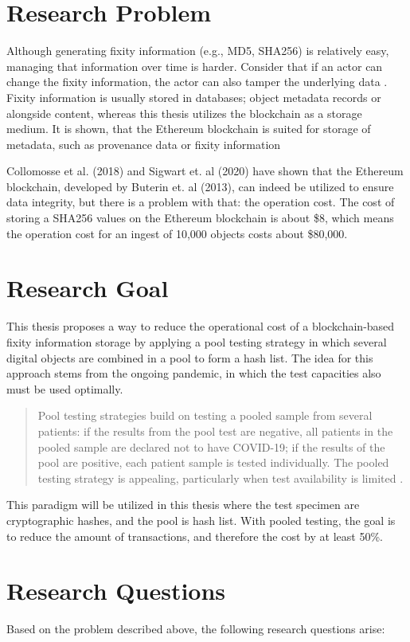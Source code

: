 \section{Research Problem}
Although generating fixity information (e.g., MD5, SHA256) is relatively easy, managing that information over time is harder. Consider that if an actor can change the fixity information, the actor can also tamper the underlying data \cite[35]{kirschenbaum2010digital}. Fixity information is usually stored in databases; object metadata records or alongside content, whereas this thesis utilizes the blockchain as a storage medium.
It is shown, that the Ethereum blockchain is suited for storage of metadata, such as provenance data or fixity information

Collomosse et al. (2018) and Sigwart et. al (2020) have shown that the Ethereum blockchain, developed by Buterin et. al (2013), can indeed be utilized to ensure data integrity, but there is a problem with that: the operation cost. The cost of storing a SHA256 values on the Ethereum blockchain is about \$8, which means the operation cost for an ingest of 10,000 objects costs about \$80,000.

\section{Research Goal}
This thesis proposes a way to reduce the operational cost of a blockchain-based fixity information storage by applying a pool testing strategy in which several digital objects are combined in a pool to form a hash list. The idea for this approach stems from the ongoing pandemic, in which the test capacities also must be used optimally.
\begin{quote}
Pool testing strategies build on testing a pooled sample from several patients: if the results from the pool test are negative, all patients in the pooled sample are declared not to have COVID-19; if the results of the pool are positive, each patient sample is tested individually. The pooled testing strategy is appealing, particularly when test availability is limited \cite[1]{cherif2020simulation}.
\end{quote}
This paradigm will be utilized in this thesis where the test specimen are cryptographic hashes, and the pool is hash list. With pooled testing, the goal is to reduce the amount of transactions, and therefore the cost by at least 50\%.

\section{Research Questions}
Based on the problem described above, the following research questions arise:

